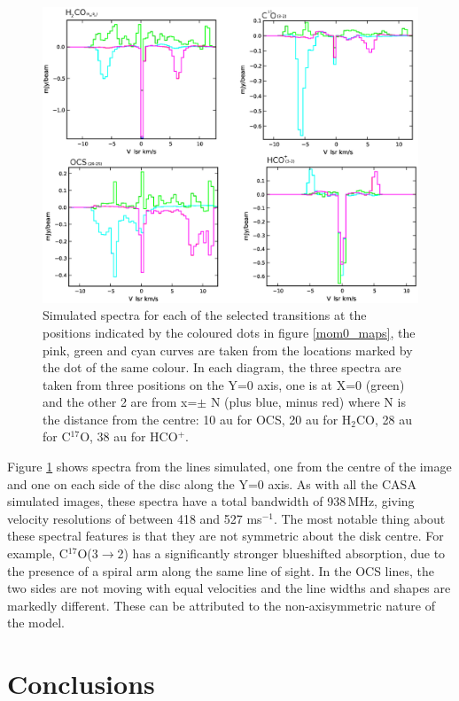 \documentclass[useAMS,usenatbib]{mn2e}
\begin{document}
\begin{figure}
 \includegraphics[width=168mm]{Figures/sim/casa_all_spectra2.eps}
 \caption{Simulated spectra for each of the selected transitions at the positions indicated by the coloured dots in figure \ref{mom0_maps}, the pink, green and cyan curves are taken from the locations marked by the dot of the same colour. In each diagram, the three spectra are taken from three positions on the Y=0 axis, one is at X=0 (green) and the other 2 are from x=$\pm$ N (plus blue, minus red) where N is the distance from the centre: 10 au for OCS, 20 au for H$_2$CO, 28 au for C$^{17}$O, 38 au for HCO$^+$.}
 \label{spectra}
\end{figure}

Figure \ref{spectra} shows spectra from the lines simulated, one from the centre of the image and one on each side of the disc along the Y=0 axis. As with all the CASA simulated images, these spectra have a total bandwidth of 938$\,$MHz, giving velocity resolutions of between 418 and 527 ms$^{-1}$. The most notable thing about these spectral features is that they are not symmetric about the disk centre. For example, C$^{17}$O(3$\rightarrow$2) has a significantly stronger blueshifted absorption, due to the presence of a spiral arm along the same line of sight. In the OCS lines, the two sides are not moving with equal velocities and the line widths and shapes are markedly different. These can be attributed to the non-axisymmetric nature of the model.

\section{Conclusions} \label{sec:discussion}
\end{document}
